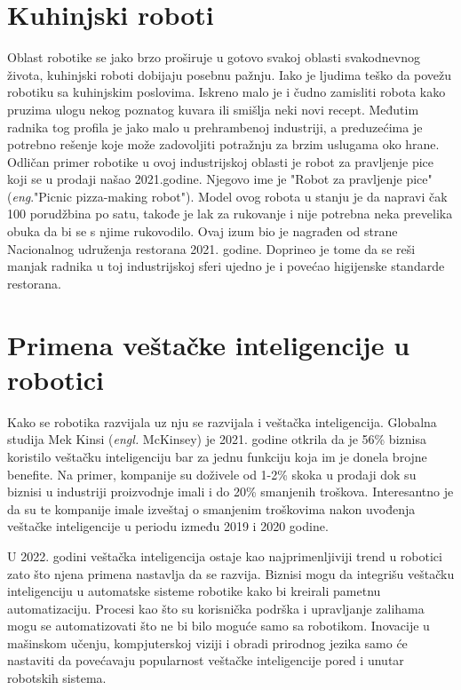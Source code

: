 \documentclass{article}
\begin{document}
\section{Kuhinjski roboti}
Oblast robotike se jako brzo proširuje u gotovo svakoj oblasti svakodnevnog života, kuhinjski roboti dobijaju posebnu pažnju. Iako je ljudima teško da povežu robotiku sa kuhinjskim poslovima. Iskreno malo je i čudno zamisliti robota kako pruzima ulogu nekog poznatog kuvara ili smišlja neki novi recept. Međutim radnika tog profila je jako malo u prehrambenoj industriji, a preduzećima je potrebno rešenje koje može zadovoljiti potražnju za brzim uslugama oko hrane. Odličan primer robotike u ovoj industrijskoj oblasti je robot za pravljenje pice koji se u prodaji našao 2021.godine. Njegovo ime je "Robot za pravljenje pice" (\emph{eng}."Picnic pizza-making robot")\cite{robotics2022}. Model ovog robota u stanju je da napravi čak 100 porudžbina po satu, takođe je lak za rukovanje i nije potrebna neka prevelika obuka da bi se s njime rukovodilo. Ovaj izum bio je nagrađen od strane Nacionalnog udruženja restorana  2021. godine. Doprineo je tome da se reši manjak radnika u toj industrijskoj sferi ujedno je i povećao higijenske standarde restorana.\cite{foodservice robots}


\section{Primena veštačke inteligencije u robotici}
Kako se robotika razvijala uz nju se razvijala i veštačka inteligencija. Globalna studija Mek Kinsi (\emph{engl. }McKinsey)\cite{McKinsey} je 2021. godine
otkrila da je 56\% biznisa koristilo veštačku inteligenciju bar za jednu funkciju koja im je donela brojne benefite. Na primer, kompanije su doživele od 1-2\% skoka u prodaji dok su biznisi u industriji proizvodnje
imali i do 20\% smanjenih troškova. Interesantno je da su te kompanije imale izveštaj o smanjenim troškovima nakon uvođenja veštačke inteligencije
u periodu između 2019 i 2020 godine.\par
U 2022. godini veštačka inteligencija ostaje kao najprimenljiviji trend u robotici zato što njena primena nastavlja da se razvija. Biznisi mogu da integrišu veštačku inteligenciju u automatske sisteme robotike kako bi
kreirali pametnu automatizaciju. Procesi kao što su korisnička podrška i upravljanje zalihama mogu se  automatizovati što ne bi bilo moguće samo sa robotikom. Inovacije u mašinskom učenju, kompjuterskoj viziji i obradi prirodnog jezika samo će nastaviti da povećavaju popularnost veštačke inteligencije pored i unutar robotskih sistema.\cite{robotics2022} 
\end{document}
